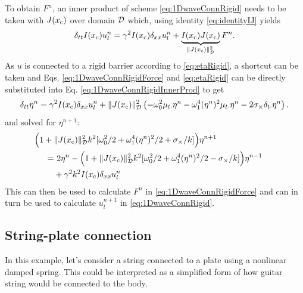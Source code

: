 To obtain $F^n$, an inner product of scheme \eqref{eq:1DwaveConnRigid} needs to be taken with $J(x_{\text{c}})$ over domain $\mathcal{D}$ which, using identity \eqref{eq:identityIJ} yields 
\begin{equation}\label{eq:1DwaveConnRigidInnerProd}
    \delta_{tt} I(x_{\text{c}})u_l^n = \gamma^2 I(x_{\text{c}})\delta_{xx} u_l^n + \underbrace{I(x_{\text{c}})J(x_{\text{c}})}_{\lVert J(x_{\text{c}}) \rVert^2_{\mathcal{D}}}F^n.
\end{equation}
As $u$ is connected to a rigid barrier according to \eqref{eq:etaRigid}, a shortcut can be taken and Eqs. \eqref{eq:1DwaveConnRigidForce} and \eqref{eq:etaRigid} can be directly substituted into Eq. \eqref{eq:1DwaveConnRigidInnerProd} to get
\begin{equation}
    \delta_{tt} \eta^n = \gamma^2 I(x_{\text{c}})\delta_{xx} u_l^n + \lVert J(x_{\text{c}})\rVert^2_{\mathcal{D}}\left( -\omega_0^2\mu_{t\cdot}\eta^n - \omega_1^4(\eta^n)^2\mu_{t\cdot}\eta^n - 2\sigma_\times \delta_{t\cdot} \eta^n\right).
\end{equation}
and solved for $\eta^{n+1}$:
\begin{equation}
    \begin{aligned}
    &\!\!\!\!\!\!\!\!\!\!\!\!\!\!\Big(1 + \lVert J(x_\ctxt)\rVert^2_\D k^2[\omega_0^2/2 + \omega_1^4(\eta^n)^2/2 + \sigma_\times/k] \Big)\eta^{n+1} \\
   = &\ 2 \eta^n - \Big(1 + \lVert J(x_\ctxt)\rVert^2_\D k^2[\omega_0^2/2 + \omega_1^4(\eta^n)^2/2 - \sigma_\times/k]\Big)
    \eta^{n-1}\\
    &+ \gamma^2k^2 I(x_\ctxt)\dxx\uln
    \end{aligned}
\end{equation}
This can then be used to calculate $F^n$ in \eqref{eq:1DwaveConnRigidForce} and can in turn be used to calculate $u_l^{n+1}$ in \eqref{eq:1DwaveConnRigid}.

\subsection{String-plate connection}
In this example, let's consider a string connected to a plate using a nonlinear damped spring. This could be interpreted as a simplified form of how guitar string would be connected to the body. 

